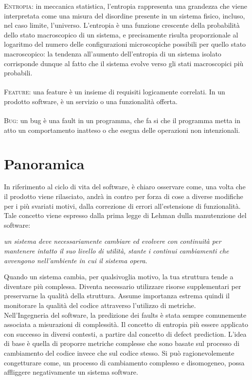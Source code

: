 \textsc{Entropia}: in meccanica statistica, l'entropia rappresenta una grandezza che viene interpretata come una misura del disordine presente in un sistema fisico, incluso, nel caso limite, l'universo. L'entropia è una funzione crescente della probabilità dello stato macroscopico di un sistema, e precisamente risulta proporzionale al logaritmo del numero delle configurazioni microscopiche possibili per quello stato macroscopico: la tendenza all'aumento dell'entropia di un sistema isolato corrisponde dunque al fatto che il sistema evolve verso gli stati macroscopici più probabili. \\ \\
\textsc{Feature}: una feature è un insieme di requisiti logicamente correlati. In un prodotto software, è un servizio o una funzionalità offerta.
\\ \\
\textsc{Bug}: un bug è una fault in un programma, che fa si che il programma metta in atto un comportamento inatteso o che esegua delle operazioni non intenzionali.
\section{Panoramica}

In riferimento al ciclo di vita del software, è chiaro osservare come, una volta che il prodotto viene rilasciato, andrà in contro per forza di cose a diverse modifiche per i più svariati motivi, dalla correzione di errori all'estensione di funzionalità. Tale concetto viene espresso dalla prima legge di Lehman dulla manutenzione del software:
\begin{center}
\textit{un sistema deve necessariamente cambiare ed evolvere con continuità per mantenere intatto il suo livello di utilità, stante i continui cambiamenti che avvengono nell'ambiente in cui il sistema opera}.
\end{center}
Quando un sistema cambia, per qualsivoglia motivo, la tua struttura tende a diventare più complessa. Diventa necessario utilizzare risorse supplementari per preservarne la qualità della struttura. Assume importanza estrema quindi il monitorare la qualità del codice attraverso l'utilizzo di metriche.\\

Nell'Ingegneria del software, la predizione dei faults è stata sempre comunemente associata a misurazioni di complessità. Il concetto di entropia più essere applicato con successo in diversi contesti, a partire dal concetto di defect prediction. L'idea di base è quella di proporre metriche complesse che sono basate sul processo di cambiamento del codice invece che sul codice stesso. Si può ragionevolemente congetturare come, un processo di cambiamento complesso e disomogeneo, possa affliggere negativamente un sistema software. 

